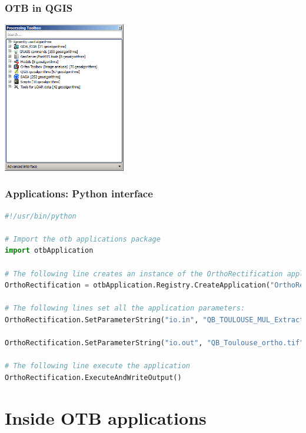 \documentclass[8pt]{beamer}
\begin{document}
\begin{frame}[fragile]
\frametitle{OTB in QGIS}
\begin{center}
\includegraphics[width=0.4\textwidth]{images/otb_qgis.png}
\end{center}
\end{frame}

\begin{frame}[fragile]
\frametitle{Applications: Python interface}
\begin{lstlisting}[language=python,breaklines=true,breakatwhitespace=true,frame = tb,framerule = 0.25pt,fontadjust,backgroundcolor={\color{listlightgray}},basicstyle = {\ttfamily\tiny},keywordstyle = {\ttfamily\color{listkeyword}\textbf},identifierstyle = {\ttfamily},commentstyle = {\ttfamily\color{listcomment}\textit},stringstyle = {\ttfamily},showstringspaces = false,showtabs = false,numbers = none,numbersep = 6pt, numberstyle={\ttfamily\color{listnumbers}},tabsize = 2]
#!/usr/bin/python 

# Import the otb applications package 
import otbApplication 

# The following line creates an instance of the OrthoRectification application 
OrthoRectification = otbApplication.Registry.CreateApplication("OrthoRectification") 

# The following lines set all the application parameters: 
OrthoRectification.SetParameterString("io.in", "QB_TOULOUSE_MUL_Extract_500_500.tif") 

OrthoRectification.SetParameterString("io.out", "QB_Toulouse_ortho.tif") 

# The following line execute the application 
OrthoRectification.ExecuteAndWriteOutput()
\end{lstlisting}
\end{frame}

\section{Inside OTB applications}
\end{document}
